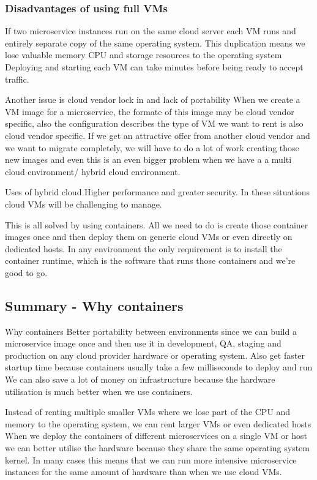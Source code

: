 \subsubsection{Disadvantages of using full VMs}
If two microservice instances run on the same cloud server each VM runs and entirely separate copy of the same operating system.
This duplication means we lose valuable memory CPU and storage resources to the operating system
Deploying and starting each VM can take minutes before being ready to accept traffic.

Another issue is cloud vendor lock in and lack of portability
When we create a VM image for a microservice,  the formate of this image may be cloud vendor specific, also the configuration describes the type of VM we want to rent is also cloud vendor specific.
If we get an attractive offer from another cloud vendor and we want to migrate completely, we will have to do a lot of work creating those new images and even this is an even bigger problem when we have a a multi cloud environment/ hybrid cloud environment.

Uses of hybrid cloud
Higher performance and greater security.
In these situations cloud VMs will be challenging to manage.

This is all solved by using containers.
All we need to do is create those container images once and then deploy them on generic cloud VMs or even directly on dedicated hosts.
In any environment the only requirement is to install the container runtime, which is the software that runs those containers and we're good to go.

\subsection{Summary - Why containers}
Why containers
Better portability between environments since we can build a microservice image once and then use it in development, QA, staging and production on any cloud provider hardware or operating system.
Also get faster startup time because containers usually take a few milliseconds to deploy and run
We can also save a lot of money on infrastructure because the hardware utilisation is much better when we use containers.

Instead of renting multiple smaller VMs where we lose part of the CPU and memory to the operating system, we can rent larger VMs or even dedicated hosts
When we deploy the containers of different microservices on a single VM or host we can better utilise the hardware because they share the same operating system kernel.
In many cases this means that we can run more intensive microservice instances for the same amount of hardware than when we use cloud VMs.

